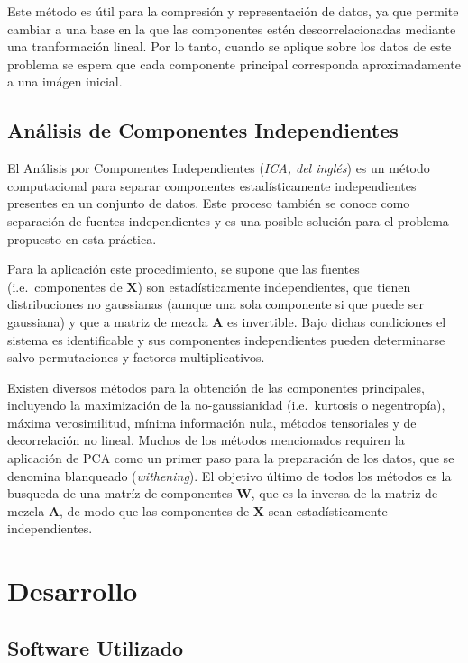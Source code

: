 \documentclass{article}
\begin{document}
Este método es útil para la compresión y representación de datos, ya que
permite cambiar a una base en la que las componentes estén
descorrelacionadas mediante una tranformación lineal. Por lo tanto,
cuando se aplique sobre los datos de este problema se espera que cada
componente principal corresponda aproximadamente a una imágen inicial.


    \subsection{Análisis de Componentes Independientes}


    El Análisis por Componentes Independientes (\emph{ICA, del inglés}) es
un método computacional para separar componentes estadísticamente
independientes presentes en un conjunto de datos. Este proceso también
se conoce como separación de fuentes independientes y es una posible
solución para el problema propuesto en esta práctica.

Para la aplicación este procedimiento, se supone que las fuentes
(i.e.~componentes de \(\mathbf{X}\)) son estadísticamente
independientes, que tienen distribuciones no gaussianas (aunque una sola
componente si que puede ser gaussiana) y que a matriz de mezcla
\(\mathbf{A}\) es invertible. Bajo dichas condiciones el sistema es
identificable y sus componentes independientes pueden determinarse salvo
permutaciones y factores multiplicativos.

Existen diversos métodos para la obtención de las componentes
principales, incluyendo la maximización de la no-gaussianidad
(i.e.~kurtosis o negentropía), máxima verosimilitud, mínima información
nula, métodos tensoriales y de decorrelación no lineal. Muchos de los
métodos mencionados requiren la aplicación de PCA como un primer paso
para la preparación de los datos, que se denomina blanqueado
(\emph{withening}). El objetivo último de todos los métodos es la
busqueda de una matríz de componentes \(\mathbf{W}\), que es la inversa
de la matriz de mezcla \(\mathbf{A}\), de modo que las componentes de
\(\mathbf{X}\) sean estadísticamente independientes.


    \section{Desarrollo}



    \subsection{Software Utilizado}
\end{document}
